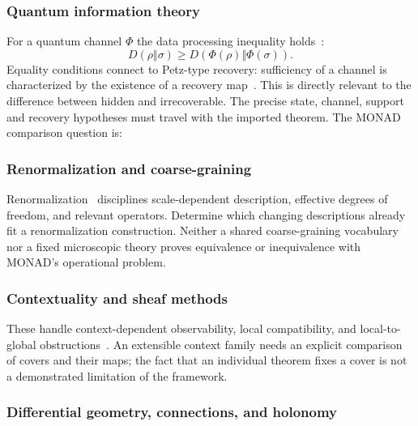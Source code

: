 \subsubsection{Quantum information theory}\label{ss:qit}

For a quantum channel $\Phi$ the data processing inequality
holds~\cite{nielsen2010quantum}:
\begin{equation}
  D(\rho \Vert \sigma) \ge D(\Phi(\rho) \Vert \Phi(\sigma)).\label{eq:dpi}
\end{equation}
Equality conditions connect to Petz-type recovery: sufficiency of a
channel is characterized by the existence of a recovery
map~\cite{petz1986sufficient,hayden2004structure}. This is directly
relevant to the difference between hidden and irrecoverable. The precise
state, channel, support and recovery hypotheses must travel with the
imported theorem. The MONAD comparison question is:


\subsubsection{Renormalization and coarse-graining}

Renormalization~\cite{wilson1975renormalization} disciplines
scale-dependent description, effective
degrees of freedom, and relevant operators. Determine which changing
descriptions already fit a renormalization construction. Neither a
shared coarse-graining vocabulary nor a fixed microscopic theory proves
equivalence or inequivalence with MONAD's operational problem.

\subsubsection{Contextuality and sheaf methods}

These handle context-dependent observability, local compatibility, and
local-to-global obstructions~\cite{abramsky2011sheaf}. An extensible
context family needs an explicit comparison of covers and their maps;
the fact that an individual theorem fixes a cover is not a demonstrated
limitation of the framework.

\subsubsection{Differential geometry, connections, and holonomy}\label{ss:holonomy}


